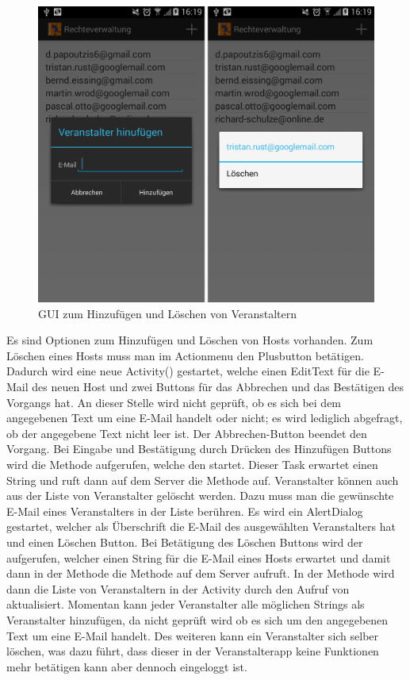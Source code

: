 
\begin{figure}[htb]
\centering
\includegraphics[width=12cm]{graphics/Host_hinzufuegen_loeschen.png}
\caption{GUI zum Hinzufügen und Löschen von Veranstaltern}
\label{fig:hosts_hinzufuegen_Loeschen}
\end{figure}

Es sind Optionen zum Hinzufügen und Löschen von Hosts vorhanden. Zum Löschen eines Hosts muss man im Actionmenu den Plusbutton betätigen. Dadurch wird eine neue Activity() gestartet, welche einen EditText für die E-Mail des neuen Host und zwei Buttons für das Abbrechen und das Bestätigen des Vorgangs hat. An dieser Stelle wird nicht geprüft, ob es sich bei dem angegebenen Text um eine E-Mail handelt oder nicht; es wird lediglich abgefragt, ob der angegebene Text nicht leer ist. Der Abbrechen-Button beendet den Vorgang. Bei Eingabe und Bestätigung durch Drücken des Hinzufügen Buttons wird die  Methode aufgerufen, welche den  startet. Dieser Task erwartet einen String und ruft dann auf dem Server die  Methode auf. Veranstalter können auch aus der Liste von Veranstalter gelöscht werden. Dazu muss man die gewünschte E-Mail eines Veranstalters in der Liste berühren. Es wird ein AlertDialog gestartet, welcher als Überschrift die E-Mail des ausgewählten Veranstalters hat und einen Löschen Button. Bei Betätigung des Löschen Buttons wird der  aufgerufen, welcher einen String für die E-Mail eines Hosts erwartet und damit dann in der  Methode die  Methode auf dem Server aufruft. In der  Methode wird dann die Liste von Veranstaltern  in der Activity durch den Aufruf von  aktualisiert. Momentan kann jeder Veranstalter alle möglichen Strings als Veranstalter hinzufügen, da nicht geprüft wird ob es sich um den angegebenen Text um eine E-Mail handelt. Des weiteren kann ein Veranstalter sich selber löschen, was dazu führt, dass dieser in der Veranstalterapp keine Funktionen mehr betätigen kann aber dennoch eingeloggt ist.
\FloatBarrier

